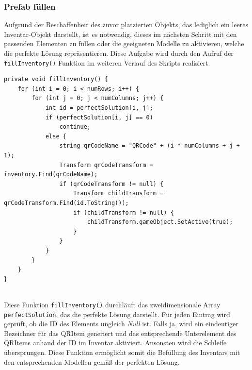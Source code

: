 \begin{itemize}
\subsubsection{Prefab füllen}
Aufgrund der Beschaffenheit des zuvor platzierten Objekts, das lediglich ein leeres Inventar-Objekt darstellt, ist es
notwendig, dieses im nächsten Schritt mit den passenden Elementen zu füllen oder die geeigneten Modelle zu aktivieren,
welche die perfekte Lösung repräsentieren. Diese Aufgabe wird durch den Aufruf der \texttt{fillInventory()} Funktion im
weiteren Verlauf des Skripts realisiert.
\begin{lstlisting}[style=csharp, caption={Inventar fuellen}, label=code:invFül_PSV]
private void fillInventory() {
    for (int i = 0; i < numRows; i++) {
        for (int j = 0; j < numColumns; j++) {
            int id = perfectSolution[i, j];
            if (perfectSolution[i, j] == 0)
                continue;
            else {
                string qrCodeName = "QRCode" + (i * numColumns + j + 1);
                Transform qrCodeTransform = inventory.Find(qrCodeName);
                if (qrCodeTransform != null) {
                    Transform childTransform = qrCodeTransform.Find(id.ToString());
                    if (childTransform != null) {
                        childTransform.gameObject.SetActive(true);
                    }
                }
            }
        }
    }
}
\end{lstlisting}\\
Diese Funktion \texttt{fillInventory()} durchläuft das zweidimensionale Array \texttt{perfectSolution}, das die perfekte
Lösung darstellt. Für jeden Eintrag wird geprüft, ob die ID des Elements ungleich \textit{Null} ist. Falls ja, wird ein
eindeutiger Bezeichner für das QRItem generiert und das entsprechende Unterelement des QRItems anhand der ID im Inventar
aktiviert. Ansonsten wird die Schleife übersprungen. Diese Funktion ermöglicht somit die Befüllung des Inventars mit den
entsprechenden Modellen gemäß der perfekten Lösung.


\end{itemize}
